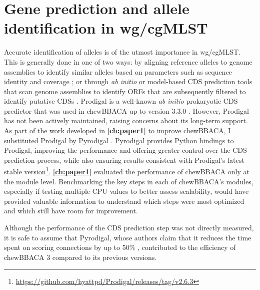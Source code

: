 \section{Gene prediction and allele identification in wg/cgMLST}

Accurate identification of alleles is of the utmost importance in \ac{wg/cgMLST}. This is generally done in one of two ways: by aligning reference alleles to genome assemblies to identify similar alleles based on parameters such as sequence identity and coverage \cite{jolley_open-access_2018}; or through \textit{ab initio} or model-based \ac{CDS} prediction tools that scan genome assemblies to identify \ac{ORFs} that are subsequently filtered to identify putative \ac{CDSs} \cite{dimonaco_no_2022}. Prodigal is a well-known \textit{ab initio} prokaryotic \ac{CDS} predictor that was used in chewBBACA up to version 3.3.0 \cite{hyatt_prodigal_2010, silva_chewbbaca_2018}. However, Prodigal has not been actively maintained, raising concerns about its long-term support. As part of the work developed in \textbf{\autoref{ch:paper1}} to improve chewBBACA, I substituted Prodigal by Pyrodigal \cite{larralde_pyrodigal_2022}. Pyrodigal provides Python bindings to Prodigal, improving the performance and offering greater control over the \ac{CDS} prediction process, while also ensuring results consistent with Prodigal's latest stable version\footnote{\url{https://github.com/hyattpd/Prodigal/releases/tag/v2.6.3}}. \textbf{\autoref{ch:paper1}} evaluated the performance of chewBBACA only at the module level. Benchmarking the key steps in each of chewBBACA's modules, especially if testing multiple CPU values to better assess scalability, would have provided valuable information to understand which steps were most optimized and which still have room for improvement.

Although the performance of the CDS prediction step was not directly measured, it is safe to assume that Pyrodigal, whose authors claim that it reduces the time spent on scoring connections by up to 50\% \cite{larralde_pyrodigal_2022}, contributed to the efficiency of chewBBACA 3 compared to its previous versions.


